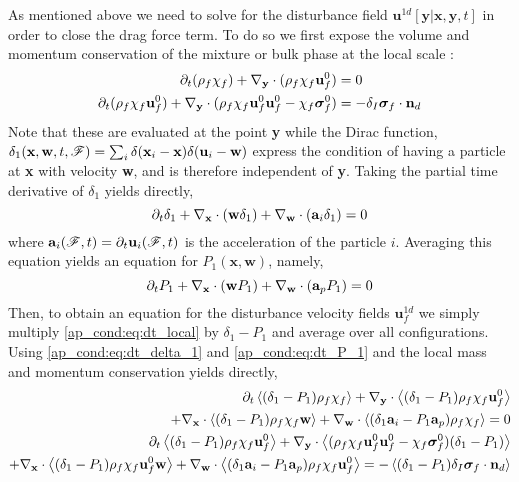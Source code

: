As mentioned above we need to solve for the disturbance field $\textbf{u}^{1d}[\textbf{y}|\textbf{x},\textbf{y},t]$ in order to close the drag force term. 
To do so we first expose the volume and momentum conservation of the mixture or bulk phase at the local scale :
\begin{align}
    \pddt (\rho_f\chi_f) +  \pddy \cdot (\rho_f\chi_f\textbf{u}^0_f) &= 0 \\
    \pddt (\rho_f\chi_f\textbf{u}^0_f)
    + \pddy\cdot (\rho_f\chi_f\textbf{u}^0_f\textbf{u}^0_f - \chi_f\bm\sigma^0_f)
    &= - \delta_I \bm\sigma_f \cdot \textbf{n}_d  
    \label{ap_cond:eq:dt_local}
\end{align}
Note that these are evaluated at the point \textbf{y} while the Dirac function, $\delta_1(\textbf{x},\textbf{w},t,\mathscr{F}) = \sum_i \delta(\textbf{x}_i-\textbf{x})\delta(\textbf{u}_i - \textbf{w})$ express the condition of having a particle at \textbf{x} with velocity \textbf{w}, and is therefore independent of \textbf{y}. 
Taking the partial time derivative of $\delta_1$ yields directly, 
\begin{equation}
    \pddt\delta_1 
    + \pddx\cdot(\textbf{w}\delta_1)
    + \pddw\cdot(\textbf{a}_i\delta_1)
    = 0 
    \label{ap_cond:eq:dt_delta_1}
\end{equation}
where $\textbf{a}_i(\mathscr{F},t) = \partial_t \textbf{u}_i(\mathscr{F},t)$ is the acceleration of the particle $i$. 
Averaging this equation yields an equation for  $P_1(\textbf{x},\textbf{w})$, namely, 
\begin{equation}
    \pddt P_1 
    + \pddx\cdot(\textbf{w} P_1)
    + \pddw\cdot(\textbf{a}_p P_1)
    = 0 
    \label{ap_cond:eq:dt_P_1}
\end{equation}
Then, to obtain an equation for the disturbance velocity fields $\textbf{u}^{1d}_f$ we simply multiply \ref{ap_cond:eq:dt_local} by $\delta_1 - P_1$ and average over all configurations. 
Using \ref{ap_cond:eq:dt_delta_1} and \ref{ap_cond:eq:dt_P_1} and the local mass and momentum conservation yields directly, 
\begin{align}
    \pddt \avg{(\delta_1 - P_1)\rho_f\chi_f}
    + \pddy\cdot \avg{(\delta_1 - P_1)\rho_f\chi_f\textbf{u}^0_f} \nonumber \\
    + \pddx\cdot \avg{(\delta_1 - P_1)\rho_f \chi_f \textbf{w}}
    + \pddw\cdot \avg{(\delta_1\textbf{a}_i - P_1\textbf{a}_p)\rho_f \chi_f }
    = 0 
    \label{ap_cond:eq:conditional_eqs_mass}
    \\
    \pddt \avg{(\delta_1 - P_1)\rho_f \chi_f \textbf{u}^0_f}
    + \pddy\cdot \avg{(\rho_f \chi_f \textbf{u}^0_f\textbf{u}^0_f- \chi_f \bm\sigma^0_f )(\delta_1 - P_1)} \nonumber \\ 
    + \pddx\cdot \avg{(\delta_1 - P_1)\rho_f \chi_f \textbf{u}^0_f\textbf{w}}
    + \pddw\cdot \avg{(\delta_1\textbf{a}_i - P_1\textbf{a}_p)\rho_f \chi_f \textbf{u}^0_f}
    = - \avg{(\delta_1 - P_1)\delta_I \bm\sigma_f \cdot \textbf{n}_d}
    \label{ap_cond:eq:conditional_eqs}
\end{align}
